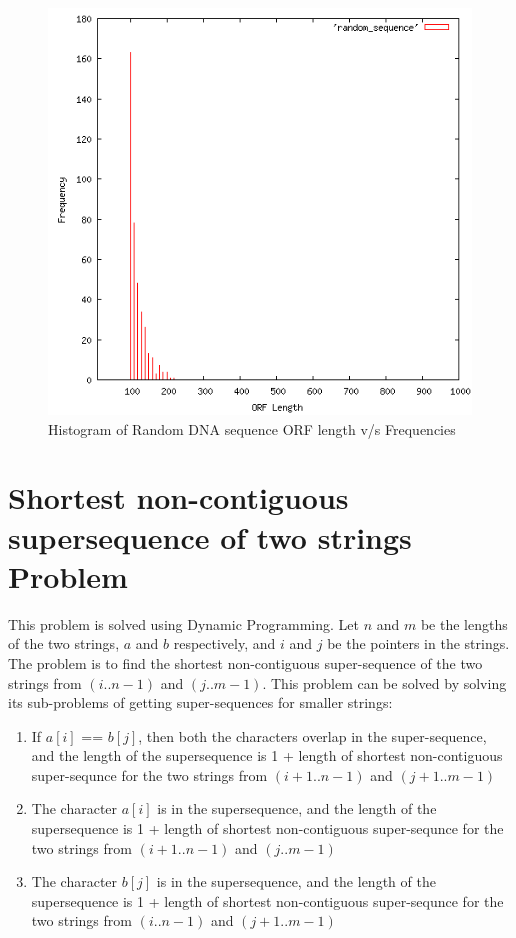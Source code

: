 \documentclass{article}
\begin{document}
\begin{figure}[htp]
\centering
\includegraphics[scale=0.5]{random_sequence.png}
\caption{Histogram of Random DNA sequence ORF length v/s Frequencies}\label{fig:fs}
\end{figure}


\clearpage


\clearpage

 
\clearpage

\section{Shortest non-contiguous supersequence of two strings Problem}
This problem is solved using Dynamic Programming. Let $n$ and $m$ be the lengths of the two strings, $a$ and $b$ respectively, and $i$ and $j$ be the pointers in the strings. The problem is to find the shortest non-contiguous super-sequence of the two strings from $(i..n-1)$ and $(j..m-1)$. This problem can be solved by solving its sub-problems of getting super-sequences for smaller strings:
\begin{enumerate}
\item If $a[i]$ == $b[j]$, then both the characters overlap in the super-sequence, and the length of the supersequence is 1 + length of shortest non-contiguous super-sequnce for the two strings from $(i+1..n-1)$ and $(j+1..m-1)$
\item The character $a[i]$ is in the supersequence, and the length of the supersequence is 1 + length of shortest non-contiguous super-sequnce for the two strings from $(i+1..n-1)$ and $(j..m-1)$
\item The character $b[j]$ is in the supersequence, and the length of the supersequence is 1 + length of shortest non-contiguous super-sequnce for the two strings from $(i..n-1)$ and $(j+1..m-1)$
\end{enumerate}
\end{document}
